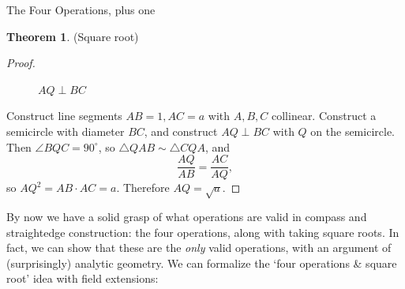 \documentclass[12pt]{article}
\theoremstyle{definition}
\theoremstyle{definition}
\theoremstyle{definition}
\newtheorem{theorem}{Theorem}[section]
\theoremstyle{definition}
\theoremstyle{definition}
\theoremstyle{definition}
\theoremstyle{definition}
\begin{document}
\begin{section}{The Four Operations, plus one}
\begin{theorem}{(Square root)}
\begin{proof}
\begin{figure}[h!]
                \caption{\(AQ \perp BC\)}
            \end{figure}
            Construct line segments \(AB=1, AC=a\) with \(A,B,C\) collinear. Construct a semicircle with diameter \(BC\), and 
            construct \(AQ \perp BC\) with \(Q\) on the semicircle. Then \(\angle BQC = 90^{\circ}\), so \(\triangle QAB \sim \triangle CQA\), 
            and \[\frac{AQ}{AB} = \frac{AC}{AQ},\] so \(AQ^2 = AB \cdot AC = a\). Therefore \(AQ = \sqrt{a}\).
        \end{proof}
    \end{theorem}

    By now we have a solid grasp of what operations are valid in compass and straightedge construction: the four operations, along with taking square 
    roots. In fact, we can show that these are the \textit{only} valid operations, with an argument of (surprisingly) analytic geometry. We can 
    formalize the `four operations \& square root' idea with field extensions:


\end{section}
\end{document}
